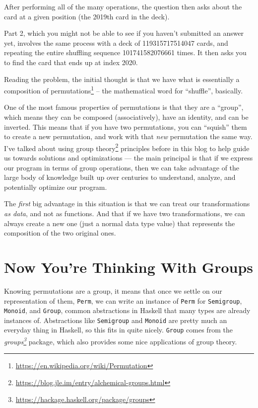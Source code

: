 \documentclass[]{article}
\renewcommand{\href}[2]{#2\footnote{\url{#1}}}
\begin{document}
After performing all of the many operations, the question then asks about the
card at a given position (the 2019th card in the deck).

Part 2, which you might not be able to see if you haven't submitted an answer
yet, involves the same process with a deck of 119315717514047 cards, and
repeating the entire shuffling sequence 101741582076661 times. It then asks you
to find the card that ends up at index 2020.

Reading the problem, the initial thought is that we have what is essentially a
composition of \href{https://en.wikipedia.org/wiki/Permutation}{permutations} --
the mathematical word for ``shuffle'', basically.

One of the most famous properties of permutations is that they are a ``group'',
which means they can be composed (associatively), have an identity, and can be
inverted. This means that if you have two permutations, you can ``squish'' them
to create a new permutation, and work with that \emph{new} permutation the same
way. I've talked about
\href{https://blog.jle.im/entry/alchemical-groups.html}{using group theory}
principles before in this blog to help guide us towards solutions and
optimizations --- the main principal is that if we express our program in terms
of group operations, then we can take advantage of the large body of knowledge
built up over centuries to understand, analyze, and potentially optimize our
program.

The \emph{first} big advantage in this situation is that we can treat our
transformations \emph{as data}, and not as functions. And that if we have two
transformations, we can always create a new one (just a normal data type value)
that represents the composition of the two original ones.

\hypertarget{now-youre-thinking-with-groups}{%
\section{Now You're Thinking With Groups}\label{now-youre-thinking-with-groups}}

Knowing permutations are a group, it means that once we settle on our
representation of them, \texttt{Perm}, we can write an instance of \texttt{Perm}
for \texttt{Semigroup}, \texttt{Monoid}, and \texttt{Group}, common abstractions
in Haskell that many types are already instances of. Abstractions like
\texttt{Semigroup} and \texttt{Monoid} are pretty much an everyday thing in
Haskell, so this fits in quite nicely. \texttt{Group} comes from the
\emph{\href{https://hackage.haskell.org/package/groups}{groups}} package, which
also provides some nice applications of group theory.
\end{document}
